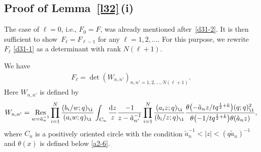 \subsection[Proof of Lemma 3.4 (i)]{Proof of Lemma~\ref{l32}\,(i)}
\label{s32}
 The case of $\ell=0$, i.e., $F_0=F$, was already mentioned after~\eqref{d31-2}.
 It is then sufficient to show~${F_{\ell}=F_{\ell-1}}$ for any $\ell=1,2,\dots$.
 For this purpose, we rewrite $F_{\ell}$ \eqref{d31-1} as a determinant with rank $N(\ell+ 1)$.
 \begin{Lemma}
 \label{l34}
 We have
 \begin{align}
 \label{3-12}
 F_{\ell}=\det\left(W_{n,n'}\right)_{n,n'=1,2,\dots,N(\ell+1)}.
 \end{align}
 Here $W_{n,n'}$ is defined by
 \begin{align}
\label{3-17}
 W_{n,n'}
 =
 \underset{w=\tilde{a}_{n}^{-1}}{\mathrm{Res}}
 \prod_{i=1}^N\frac{(b_i/w;q)_{\i}}{(a_i w;q)_{\i}}
 \int_{C_{n}}\frac{{\rm d}z}{z}
 \frac{-1}{z-\tilde{a}_{n'}^{-1}}
 \prod_{i=1}^N\frac{(a_i z;q)_{\i}}{(b_i/z;q)_{\i}}
 \frac{\theta\bigl(-\tilde{a}_{n}z/tq^{\frac12+k}\bigr)(q;q)_{\i}^2}{\theta\bigl(-1/tq^{\frac12+k}\bigr)\theta(\tilde{a}_n z)},
\end{align}
 where $C_n$ is a positively oriented circle with the condition $\tilde{a}_n^{-1}<|z|<(q\tilde{a}_n)^{-1}$ and $\theta(x)$ is defined below \eqref{a2-6}.
 \end{Lemma}


